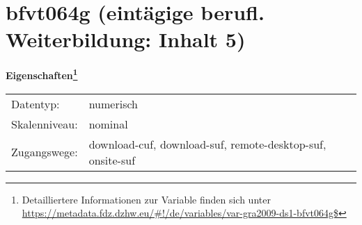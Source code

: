 
    \setcounter{footnote}{0}

    \vspace*{-1.8cm}
	\section{bfvt064g (eintägige berufl. Weiterbildung: Inhalt 5)}
	\label{section:bfvt064g}



    \vspace*{0.5cm}
    \noindent\textbf{Eigenschaften\footnote{Detailliertere Informationen zur Variable finden sich unter
		\url{https://metadata.fdz.dzhw.eu/\#!/de/variables/var-gra2009-ds1-bfvt064g$}}}\\
	\begin{tabularx}{\hsize}{@{}lX}
	Datentyp: & numerisch \\
	Skalenniveau: & nominal \\
	Zugangswege: &
	  download-cuf, 
	  download-suf, 
	  remote-desktop-suf, 
	  onsite-suf
 \\
    \end{tabularx}



